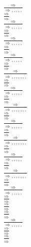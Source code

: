 \documentclass[11pt]{article}
\begin{document}
\begin{center}
\bigskip
\\$\frac{\Rightarrow }{\Rightarrow , , , , , }$
\bigskip
\\$\frac{\Rightarrow }{\Rightarrow }$
\bigskip
\\$\frac{\Rightarrow }{\Rightarrow , , , , , }$
\bigskip
\\$\frac{\Rightarrow }{\Rightarrow }$
\bigskip
\\$\frac{\Rightarrow }{\Rightarrow , , , , , }$
\bigskip
\\$\frac{\Rightarrow }{\Rightarrow }$
\bigskip
\\$\frac{\Rightarrow }{\Rightarrow , , , , , }$
\bigskip
\\$\frac{\Rightarrow }{\Rightarrow }$
\bigskip
\\$\frac{\Rightarrow }{\Rightarrow , , , , , , , }$
\bigskip
\\$\frac{\Rightarrow }{\Rightarrow }$
\bigskip
\\$\frac{\Rightarrow }{\Rightarrow , , , , , }$
\bigskip
\\$\frac{\Rightarrow }{\Rightarrow }$
\bigskip
\\$\frac{\Rightarrow }{\Rightarrow , , , , , , , }$
\bigskip
\\$\frac{\Rightarrow }{\Rightarrow }$
\bigskip
\\$\frac{\Rightarrow }{\Rightarrow , , , , , }$
\bigskip
\\$\frac{\Rightarrow }{\Rightarrow }$
\bigskip
\\$\frac{\Rightarrow }{\Rightarrow , , , , , , , }$
\bigskip
\\$\frac{\Rightarrow }{\Rightarrow }$
\bigskip
\\$\frac{\Rightarrow }{\Rightarrow , , , , , }$
\bigskip
\\$\frac{\Rightarrow }{\Rightarrow }$
\bigskip
\\$\frac{\Rightarrow }{\Rightarrow , , , , , , , }$
\bigskip
\\$\frac{\Rightarrow }{\Rightarrow }$
\bigskip
\\$\frac{\Rightarrow }{\Rightarrow , , , , , }$
\bigskip
\\$\frac{\Rightarrow }{\Rightarrow }$
\bigskip
\\$\frac{\Rightarrow }{\Rightarrow }$
\bigskip
\\$\frac{\Rightarrow }{\Rightarrow }$
\bigskip
\\$\frac{\Rightarrow }{\Rightarrow , , , , , }$
\bigskip
\\$\frac{\Rightarrow }{\Rightarrow }$
\bigskip
\\$\frac{\Rightarrow }{\Rightarrow }$

\end{center}
\end{document}
